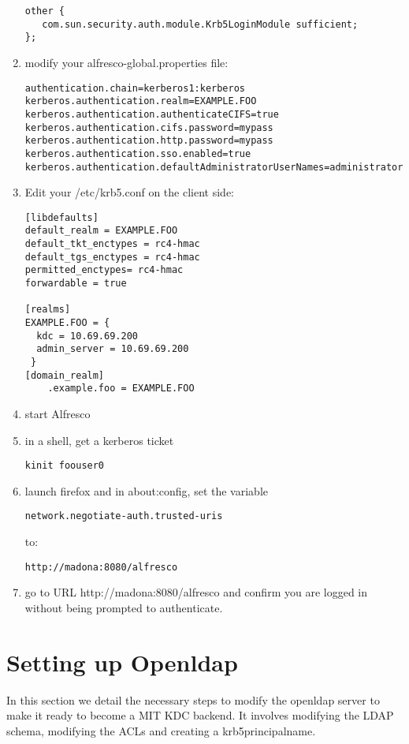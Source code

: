 \documentclass[12pt,a4]{article}
\begin{document}
\begin{enumerate}
\begin{verbatim}
other {
   com.sun.security.auth.module.Krb5LoginModule sufficient;
};
\end{verbatim}

\item modify your alfresco-global.properties file:
\begin{verbatim}
authentication.chain=kerberos1:kerberos
kerberos.authentication.realm=EXAMPLE.FOO
kerberos.authentication.authenticateCIFS=true
kerberos.authentication.cifs.password=mypass
kerberos.authentication.http.password=mypass
kerberos.authentication.sso.enabled=true
kerberos.authentication.defaultAdministratorUserNames=administrator
\end{verbatim}
\item Edit your /etc/krb5.conf on the client side:
\begin{verbatim}
[libdefaults]
default_realm = EXAMPLE.FOO
default_tkt_enctypes = rc4-hmac
default_tgs_enctypes = rc4-hmac
permitted_enctypes= rc4-hmac
forwardable = true

[realms]
EXAMPLE.FOO = {
  kdc = 10.69.69.200
  admin_server = 10.69.69.200
 }
[domain_realm]
	.example.foo = EXAMPLE.FOO
\end{verbatim}
\item start Alfresco

\item in a shell, get a kerberos ticket
\begin{verbatim}
kinit foouser0
\end{verbatim}
\item launch firefox and in about:config, set the variable

\begin{verbatim}
network.negotiate-auth.trusted-uris
\end{verbatim}
to:
\begin{verbatim}
http://madona:8080/alfresco
\end{verbatim}
\item go to URL http://madona:8080/alfresco and confirm you are logged in without being prompted to authenticate.

\end{enumerate}

\section{Setting up Openldap}
In this section we detail the necessary steps to modify the openldap server to make it ready to become a MIT KDC backend.
It involves modifying the LDAP schema, modifying the ACLs and creating a krb5principalname.
\end{document}
